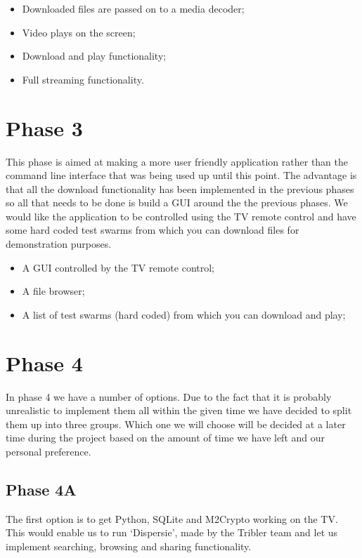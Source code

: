 \begin{itemize}
\item Downloaded files are passed on to a media decoder;
\item Video plays on the screen;
\item Download and play functionality;
\item Full streaming functionality.
\end{itemize}

\section*{Phase 3}
This phase is aimed at making a more user friendly application rather than 
the command line interface that was being used up until this point. 
The advantage is that all the download functionality has been implemented in the 
previous phases so all that needs to be done is build a GUI around the the previous phases. 
We would like the application to be controlled using the TV remote control and 
have some hard coded test swarms from which you can download files for demonstration purposes.

\begin{itemize}
\item A GUI controlled by the TV remote control;
\item A file browser;
\item A list of test swarms (hard coded) from which you can download and play;
\end{itemize}

\section*{Phase 4}
In phase 4 we have a number of options. 
Due to the fact that it is probably unrealistic to implement them all within the given time we have decided to split 
them up into three groups. 
Which one we will choose will be decided at a later time during the project based 
on the amount of time we have left and our personal preference.

\subsection*{Phase 4A}
The first option is to get Python, SQLite and M2Crypto working on the TV. 
This would enable us to run `Dispersie', made by the Tribler team and let us implement searching, 
browsing and sharing functionality.

